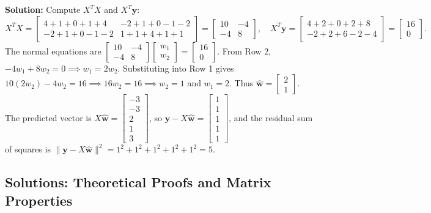 \documentclass[11pt, letterpaper]{article}
\theoremstyle{definition}
\theoremstyle{remark}
\begin{document}
\textbf{Solution:} Compute $X^T X$ and $X^T \mathbf{y}$:
\[
X^T X = \begin{bmatrix} 4+1+0+1+4 & -2+1+0-1-2 \\ -2+1+0-1-2 & 1+1+4+1+1 \end{bmatrix} = \begin{bmatrix} 10 & -4 \\ -4 & 8 \end{bmatrix}, \quad X^T \mathbf{y} = \begin{bmatrix} 4+2+0+2+8 \\ -2+2+6-2-4 \end{bmatrix} = \begin{bmatrix} 16 \\ 0 \end{bmatrix}.
\]
The normal equations are $\begin{bmatrix} 10 & -4 \\ -4 & 8 \end{bmatrix} \begin{bmatrix} w_1 \\ w_2 \end{bmatrix} = \begin{bmatrix} 16 \\ 0 \end{bmatrix}$. From Row 2, $-4w_1 + 8w_2 = 0 \implies w_1 = 2w_2$. Substituting into Row 1 gives $10(2w_2) - 4w_2 = 16 \implies 16w_2 = 16 \implies w_2 = 1$ and $w_1 = 2$. Thus $\hat{\mathbf{w}} = \begin{bmatrix} 2 \\ 1 \end{bmatrix}$.
The predicted vector is $X\hat{\mathbf{w}} = \begin{bmatrix} -3 \\ -3 \\ 2 \\ 1 \\ 3 \end{bmatrix}$, so $\mathbf{y} - X\hat{\mathbf{w}} = \begin{bmatrix} 1 \\ 1 \\ 1 \\ 1 \\ 1 \end{bmatrix}$, and the residual sum of squares is $\|\mathbf{y} - X\hat{\mathbf{w}}\|^2 = 1^2 + 1^2 + 1^2 + 1^2 + 1^2 = 5$.

\subsection{Solutions: Theoretical Proofs and Matrix Properties}
\end{document}
